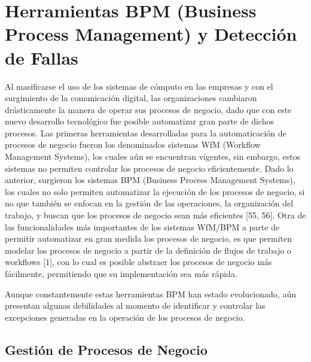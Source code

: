
\chapter{Herramientas BPM (Business Process Management) y Detección de Fallas}  %

\ifpdf
    \graphicspath{{Chapter1/Figs/Raster/}{Chapter1/Figs/PDF/}{Chapter1/Figs/}}
\else
    \graphicspath{{Chapter1/Figs/Vector/}{Chapter1/Figs/}}
\fi

Al masificarse el uso de los sistemas de cómputo en las empresas y con el surgimiento de la comunicación digital, las organizaciones cambiaron drásticamente la manera de operar sus procesos de negocio, dado que con este nuevo desarrollo tecnológico fue posible automatizar gran parte de dichos procesos. Las primeras herramientas desarrolladas para la automaticación de procesos de negocio fueron los denominados sistemas WfM (Workflow Management Systems), los cuales aún se encuentran vigentes, sin embargo, estos sistemas no permiten controlar los procesos de negocio eficientemente. Dado lo anterior, surgieron los sistemas BPM (Business Process Management Systems), los cuales no solo permiten automatizar la ejecución de los procesos de negocio, si no que también se enfocan en la gestión de las operaciones, la organización del trabajo, y buscan que los procesos de negocio sean más eficientes [55, 56]. Otra de las funcionalidades más importantes de los sistemas WfM/BPM a parte de permitir automatizar en gran medida los procesos de negocio, es que permiten modelar los procesos de negocio a partir de la definición de flujos de trabajo o workflows [1], con lo cual es posible abstraer los procesos de negocio más fácilmente, permitiendo que su implementación sea más rápida. 

Aunque constantemente estas herramientas BPM han estado evolucionado, aún presentan algunas debilidades al momento de identificar y controlar las excepciones generadas en la operación de los procesos de negocio. 

\section{Gestión de Procesos de Negocio} %
\label{section1.1}

